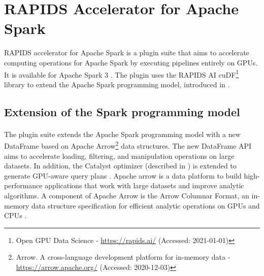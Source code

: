 \section{RAPIDS Accelerator for Apache Spark}
\label{sec:04_rapids}
RAPIDS accelerator for Apache Spark is a plugin suite that aims to accelerate computing operations for Apache Spark by executing pipelines entirely on GPUs. It is available for Apache Spark 3 \cite{SparkRapids2020Docs}.
The plugin uses the RAPIDS AI cuDF\footnote{Open GPU Data Science - \url{https://rapids.ai/} (Accessed: 2021-01-01)} library to extend the Apache Spark programming model, introduced in  \cite{SparkRapids2020Docs, Mcdonald2020SparkRapids, Aguerzame2019GPUAO}.


\subsection{Extension of the Spark programming model}
\label{subsec:04_rapids_ext}
\paragraph{}The plugin suite extends the Apache Spark programming model with a new DataFrame based on Apache Arrow\footnote{Arrow. A cross-language development platform for in-memory data - \url{https://arrow.apache.org/} (Accessed: 2020-12-03)} data structures. The new DataFrame API aims to accelerate loading, filtering, and manipulation operations on large datasets. In addition, the Catalyst optimizer (described in ) is extended to generate GPU-aware query plans \cite{Mcdonald2020SparkRapids, Aguerzame2019GPUAO}.
Apache arrow is a data platform to build high-performance applications that work with large datasets and improve analytic algorithms. A component of Apache Arrow is the Arrow Columnar Format, an in-memory data structure specification for efficient analytic operations on GPUs and CPUs \cite{ApacheArrow2020Docs}.


